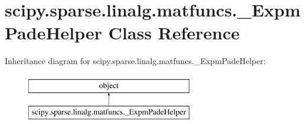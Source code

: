 \hypertarget{classscipy_1_1sparse_1_1linalg_1_1matfuncs_1_1__ExpmPadeHelper}{}\section{scipy.\+sparse.\+linalg.\+matfuncs.\+\_\+\+Expm\+Pade\+Helper Class Reference}
\label{classscipy_1_1sparse_1_1linalg_1_1matfuncs_1_1__ExpmPadeHelper}
Inheritance diagram for scipy.\+sparse.\+linalg.\+matfuncs.\+\_\+\+Expm\+Pade\+Helper\+:\begin{figure}[H]
\begin{center}
\leavevmode
\includegraphics[height=2.000000cm]{classscipy_1_1sparse_1_1linalg_1_1matfuncs_1_1__ExpmPadeHelper}
\end{center}
\end{figure}
